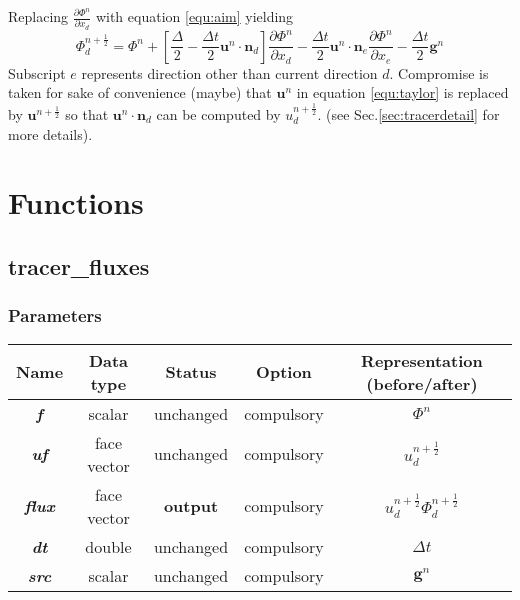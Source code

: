\documentclass[a4paper]{article}
\newcommand{\func}[1]{\textbf{\textcolor{function}{#1}}}
\newcommand{\para}[1]{\textbf{\emph{\textcolor{para}{#1}}}}
\begin{document}
Replacing $ \frac{\partial \Phi^n}{\partial x_d}$ with equation \ref{equ:aim} yielding 
\begin{equation}
  \Phi^{n+ \frac{1}{2}}_d = \Phi^n + [\frac{\Delta}{2}- \frac{\Delta t}{2} \mathbf{u}^n \cdot \mathbf{n}_d] \frac{\partial \Phi^n}{\partial x_d} - \frac{\Delta t}{2} \mathbf{u}^n\cdot \mathbf{n}_e \frac{\partial \Phi^n}{\partial x_e} - \frac{\Delta t}{2} \mathbf{g}^n \label{equ:taylor}
\end{equation}
Subscript $e$ represents direction other than current direction $d$.
Compromise is taken for sake of convenience (maybe) that $ \mathbf{u}^n$ in equation \ref{equ:taylor} is replaced by $ \mathbf{u}^{n + \frac{1}{2}}$ so that $ \mathbf{u}^n\cdot \mathbf{n}_d$ can be computed by $u_d^{n + \frac{1}{2}}$. (see Sec.\ref{sec:tracerdetail} for more details).
\section{Functions}

\subsection{\func{tracer\_fluxes}}

\subsubsection{Parameters}
\begin{center}
  \begin{tabular}{|c|c|c|c|c|}
    \hline
    Name & Data type & Status & Option & Representation (before/after)\\[0.5ex]
    \hline\hline
    \para{f} & scalar & unchanged & compulsory & $\Phi^n$\\
    \hline
    \para{uf} & face vector & unchanged & compulsory & $u_d^{n+ \frac{1}{2}}$\\
    \hline
    \rowcolor{output} \para{flux} & face vector & \textbf{output} & compulsory & $u_d^{n+ \frac{1}{2}}\Phi_d^{n+\frac{1}{2}}$\\
    \hline
    \para{dt} & double & unchanged & compulsory & $\Delta t$\\
    \hline
    \para{src} & scalar & unchanged & compulsory & $ \mathbf{g}^n$ \\
    \hline
  \end{tabular}
\end{center}
\end{document}
